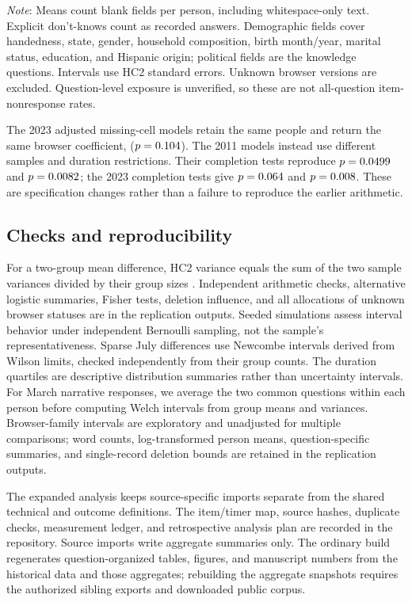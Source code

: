 \begin{table}[htbp]
\centering
\caption{Fixed-field blanks among historical survey completers.}
\label{tab:blanks}
\small

\par\smallskip
\begin{minipage}{\linewidth}\footnotesize
\emph{Note}: Means count blank fields per person, including whitespace-only text. Explicit don't-knows count as recorded answers. Demographic fields cover handedness, state, gender, household composition, birth month/year, marital status, education, and Hispanic origin; political fields are the knowledge questions. Intervals use HC2 standard errors. Unknown browser versions are excluded. Question-level exposure is unverified, so these are not all-question item-nonresponse rates.
\end{minipage}
\end{table}

The 2023 adjusted missing-cell models retain the same \HistoricalMissingN{} people and return the same browser coefficient, \HistoricalMissingGap{} ($p=0.104{}$). The 2011 models instead use different samples and duration restrictions. Their completion tests reproduce $p=0.0499{}$ and $p=0.0082{}$; the 2023 completion tests give $p=0.064{}$ and $p=0.008{}$. These are specification changes rather than a failure to reproduce the earlier arithmetic.

\subsection*{Checks and reproducibility}

For a two-group mean difference, HC2 variance equals the sum of the two sample variances divided by their group sizes \citep{sandwich}. Independent arithmetic checks, alternative logistic summaries, Fisher tests, deletion influence, and all allocations of unknown browser statuses are in the replication outputs. Seeded simulations assess interval behavior under independent Bernoulli sampling, not the sample's representativeness. Sparse July differences use Newcombe intervals derived from Wilson limits, checked independently from their group counts. The duration quartiles are descriptive distribution summaries rather than uncertainty intervals. For March narrative responses, we average the two common questions within each person before computing Welch intervals from group means and variances. Browser-family intervals are exploratory and unadjusted for multiple comparisons; word counts, log-transformed person means, question-specific summaries, and single-record deletion bounds are retained in the replication outputs.

The expanded analysis keeps source-specific imports separate from the shared technical and outcome definitions. The item/timer map, source hashes, duplicate checks, measurement ledger, and retrospective analysis plan are recorded in the repository. Source imports write aggregate summaries only. The ordinary build regenerates question-organized tables, figures, and manuscript numbers from the historical data and those aggregates; rebuilding the aggregate snapshots requires the authorized sibling exports and downloaded public corpus.
